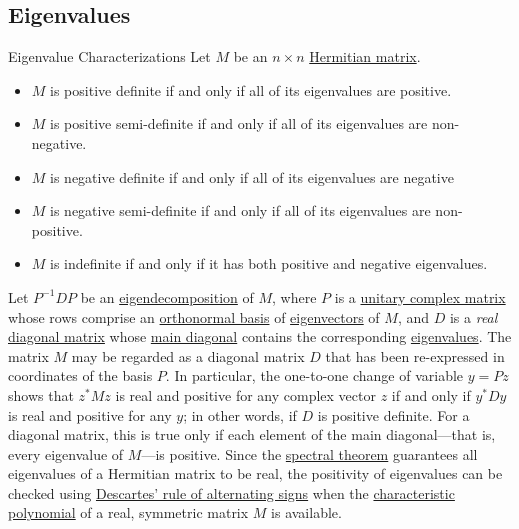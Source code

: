 \hypertarget{eigenvalues}{%
\subsection{Eigenvalues}\label{eigenvalues}}

\begin{theorem}{Eigenvalue Characterizations}{}
Let \(M\) be an \(n \times n\) \href{Hermitian_matrix}{Hermitian
matrix}.
\begin{itemize}
\item
  \(M\) is positive definite if and only if all of its eigenvalues are
  positive.
\item
  \(M\) is positive semi-definite if and only if all of its eigenvalues
  are non-negative.
\item
  \(M\) is negative definite if and only if all of its eigenvalues are
  negative
\item
  \(M\) is negative semi-definite if and only if all of its eigenvalues
  are non-positive.
\item
  \(M\) is indefinite if and only if it has both positive and negative
  eigenvalues.
\end{itemize}
\end{theorem}

Let \(P^{-1} DP\) be an
\href{eigendecomposition_of_a_matrix}{eigendecomposition} of \(M\),
where \(P\) is a \href{unitary_matrix}{unitary complex matrix} whose
rows comprise an \href{orthonormal_basis}{orthonormal basis} of
\href{eigenvector}{eigenvectors} of \(M\), and \(D\) is a \emph{real}
\href{diagonal_matrix}{diagonal matrix} whose \href{main_diagonal}{main
diagonal} contains the corresponding \href{eigenvalue}{eigenvalues}. The
matrix \(M\) may be regarded as a diagonal matrix \(D\) that has been
re-expressed in coordinates of the basis \(P\). In particular, the
one-to-one change of variable \(y = Pz\) shows that \(z^* Mz\) is real
and positive for any complex vector \(z\) if and only if \(y^* Dy\) is
real and positive for any \(y\); in other words, if \(D\) is positive
definite. For a diagonal matrix, this is true only if each element of
the main diagonal---that is, every eigenvalue of \(M\)---is positive.
Since the \href{spectral_theorem}{spectral theorem} guarantees all
eigenvalues of a Hermitian matrix to be real, the positivity of
eigenvalues can be checked using
\href{Descartes'_rule_of_signs}{Descartes' rule of alternating signs}
when the \href{characteristic_polynomial}{characteristic polynomial} of
a real, symmetric matrix \(M\) is available.

